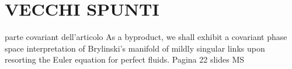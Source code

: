 \documentclass[beamer,10pt]{standalone}
\begin{document}
\appendix
\section*{VECCHI SPUNTI}
\sectionpage

\begin{frame}{parte covariant dell'articolo}
As a byproduct, we shall exhibit a covariant phase space interpretation of Brylinski's manifold of mildly singular links upon resorting the Euler equation for perfect fluids.
 Pagina 22 slides MS
\end{frame}
\end{document}
